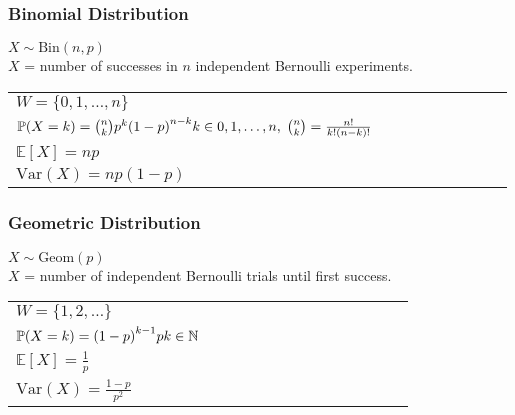 \subsubsection{Binomial Distribution}
$X \sim \mathrm{Bin}(n,p)$\\
$X$ = number of successes in $n$ independent Bernoulli experiments.

\renewcommand{\arraystretch}{1.3}
\setlength{\oldtabcolsep}{\tabcolsep}\setlength\tabcolsep{0pt}

\begin{tabularx}{\linewidth}{@{}p{0.5\linewidth}p{0.49\linewidth}@{}}
    $W=\{0,1,\ldots,n\}$                                                                                             &
    \multirow{4}{*}{
        \begin{minipage}{\linewidth}
            
        \end{minipage}
    }                                                                                                                  \\
    $\mathbb{P}(X=k)={n\choose k}p^k{(1-p)}^{n-k}\newline k\in {0,1,\ldots, n},\; {n\choose k}=\frac{n!}{k!(n-k)!} $ & \\
    $\mathbb{E}[X] = np$                                                                                             & \\
    $\mathrm{Var}(X) = np(1-p)$                                                                                      &
\end{tabularx}

\renewcommand{\arraystretch}{1}
\setlength\tabcolsep{\oldtabcolsep}

\subsubsection{Geometric Distribution}
$X \sim \mathrm{Geom}(p)$\\
$X$ = number of independent Bernoulli trials until first success.

\renewcommand{\arraystretch}{1.3}
\setlength{\oldtabcolsep}{\tabcolsep}\setlength\tabcolsep{3pt}

\begin{tabularx}{\linewidth}{@{}p{0.5\linewidth}p{0.49\linewidth}@{}}
    $W=\{1,2,\ldots\}$                                      &
    \multirow{4}{*}{
        
    }                                                         \\
    $\mathbb{P}(X=k)={(1-p)}^{k-1}p\newline k\in\mathbb{N}$ & \\
    $\mathbb{E}[X] = \frac{1}{p}$                           & \\
    $\mathrm{Var}(X) = \frac{1-p}{p^2}$
\end{tabularx}

